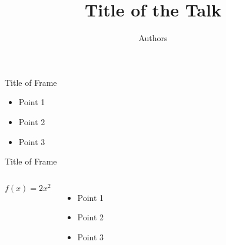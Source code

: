 \documentclass[mathserif,20pt,xcolor=table,compress,aspectratio=169]{beamer}
\title[]{Title of the Talk}
\author[]{Authors}
\institute[]{Department of Mathematics, University of Houston}
\date[]{}
\begin{document}
\begin{frame}[plain,label=mytitlepage]
\titlepage
\end{frame}


\addtolength{\headsep}{-0.28cm}

\begin{frame}{Title of Frame}
\begin{itemize}
\item Point 1
\item Point 2
\item Point 3
\end{itemize}
\end{frame}


\begin{frame}{Title of Frame}
\begin{columns}
\[
f(x) = 2x^2
\]
\begin{itemize}
\item Point 1
\item Point 2
\item Point 3
\end{itemize}
\end{columns}
\end{frame}
\end{document}
